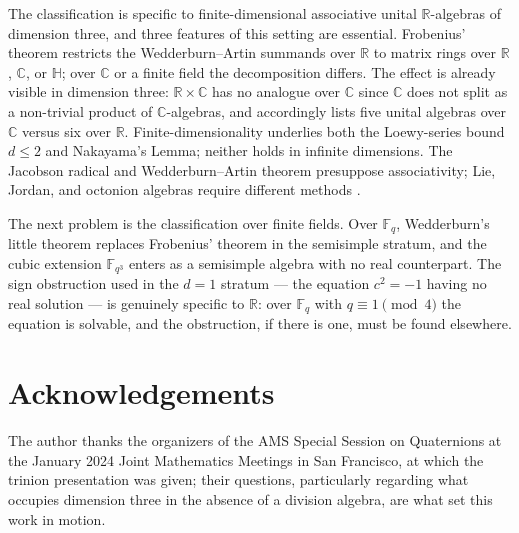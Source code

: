\documentclass{amsart}
\theoremstyle{plain}
\theoremstyle{definition}
\theoremstyle{remark}
\newcommand{\RR}{\mathbb{R}}
\newcommand{\CC}{\mathbb{C}}
\newcommand{\HH}{\mathbb{H}}
\newcommand{\FF}{\mathbb{F}}
\begin{document}
The classification is specific to finite-dimensional associative unital
$\RR$-algebras of dimension three, and three features of this setting
are essential. Frobenius' theorem restricts the Wedderburn--Artin
summands over $\RR$ to matrix rings over $\RR$, $\CC$, or $\HH$; over
$\CC$ or a finite field the decomposition differs. The effect is already
visible in dimension three: $\RR\times\CC$ has no analogue over $\CC$
since $\CC$ does not split as a non-trivial product of $\CC$-algebras,
and accordingly \cite{Kobayashi2021} lists five unital algebras over
$\CC$ versus six over $\RR$. Finite-dimensionality underlies both the
Loewy-series bound $d\leq 2$ and Nakayama's Lemma; neither holds in
infinite dimensions. The Jacobson radical and Wedderburn--Artin theorem
presuppose associativity; Lie, Jordan, and octonion algebras require
different methods \cite{Schafer1966,McCrimmon2004,Baez2002}.

The next problem is the classification over finite fields.
Over $\FF_q$, Wedderburn's little theorem replaces Frobenius' theorem
in the semisimple stratum, and the cubic extension $\FF_{q^3}$ enters
as a semisimple algebra with no real counterpart.
The sign obstruction used in the $d=1$ stratum --- the equation
$c^2 = -1$ having no real solution --- is genuinely specific
to $\RR$: over $\FF_q$ with $q \equiv 1 \pmod{4}$ the equation is
solvable, and the obstruction, if there is one, must be found elsewhere.

\section*{Acknowledgements}

The author thanks the organizers of the AMS Special Session on Quaternions
at the January 2024 Joint Mathematics Meetings in San Francisco, at which
the trinion presentation \cite{Shelton2024} was given; their questions,
particularly regarding what occupies dimension three in the absence of a
division algebra, are what set this work in motion.
\end{document}

